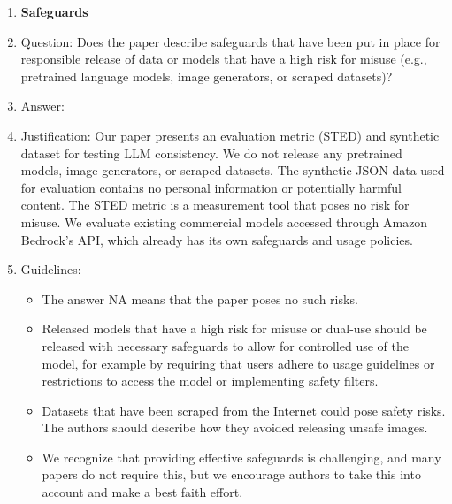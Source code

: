 \documentclass{article}
\begin{document}
\begin{enumerate}
\item {\bf Safeguards}
    \item[] Question: Does the paper describe safeguards that have been put in place for responsible release of data or models that have a high risk for misuse (e.g., pretrained language models, image generators, or scraped datasets)?
    \item[] Answer: \answerNA{} %
    \item[] Justification: \justification Our paper presents an evaluation metric (STED) and synthetic dataset for testing LLM consistency. We do not release any pretrained models, image generators, or scraped datasets. The synthetic JSON data used for evaluation contains no personal information or potentially harmful content. The STED metric is a measurement tool that poses no risk for misuse. We evaluate existing commercial models accessed through Amazon Bedrock's API, which already has its own safeguards and usage policies.{}
    \item[] Guidelines:
    \begin{itemize}
        \item The answer NA means that the paper poses no such risks.
        \item Released models that have a high risk for misuse or dual-use should be released with necessary safeguards to allow for controlled use of the model, for example by requiring that users adhere to usage guidelines or restrictions to access the model or implementing safety filters. 
        \item Datasets that have been scraped from the Internet could pose safety risks. The authors should describe how they avoided releasing unsafe images.
        \item We recognize that providing effective safeguards is challenging, and many papers do not require this, but we encourage authors to take this into account and make a best faith effort.
    \end{itemize}


\end{enumerate}
\end{document}
